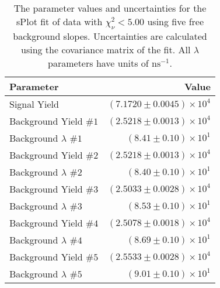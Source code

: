 
\begin{table}[ht]
    \begin{center}
        \begin{tabular}{lr}\toprule
            Parameter & Value \\\midrule
            Signal Yield & $(7.1720 \pm 0.0045) \times 10^{4}$ \\
            Background Yield $\#1$ & $(2.5218 \pm 0.0013) \times 10^{4}$ \\
            Background $\lambda$ $\#1$ & $(8.41 \pm 0.10) \times 10^{1}$ \\
            Background Yield $\#2$ & $(2.5218 \pm 0.0013) \times 10^{4}$ \\
            Background $\lambda$ $\#2$ & $(8.40 \pm 0.10) \times 10^{1}$ \\
            Background Yield $\#3$ & $(2.5033 \pm 0.0028) \times 10^{4}$ \\
            Background $\lambda$ $\#3$ & $(8.53 \pm 0.10) \times 10^{1}$ \\
            Background Yield $\#4$ & $(2.5078 \pm 0.0018) \times 10^{4}$ \\
            Background $\lambda$ $\#4$ & $(8.69 \pm 0.10) \times 10^{1}$ \\
            Background Yield $\#5$ & $(2.5533 \pm 0.0028) \times 10^{4}$ \\
            Background $\lambda$ $\#5$ & $(9.01 \pm 0.10) \times 10^{1}$ \\\bottomrule
        \end{tabular}
        \caption{The parameter values and uncertainties for the sPlot fit of data with $\chi^2_\nu < 5.00$ using five free background slopes. Uncertainties are calculated using the covariance matrix of the fit. All $\lambda$ parameters have units of $\si{\nano\second}^{-1}$.}\label{tab:splot-fit-results-chisqdof-5.00-free-5}
    \end{center}
\end{table}

